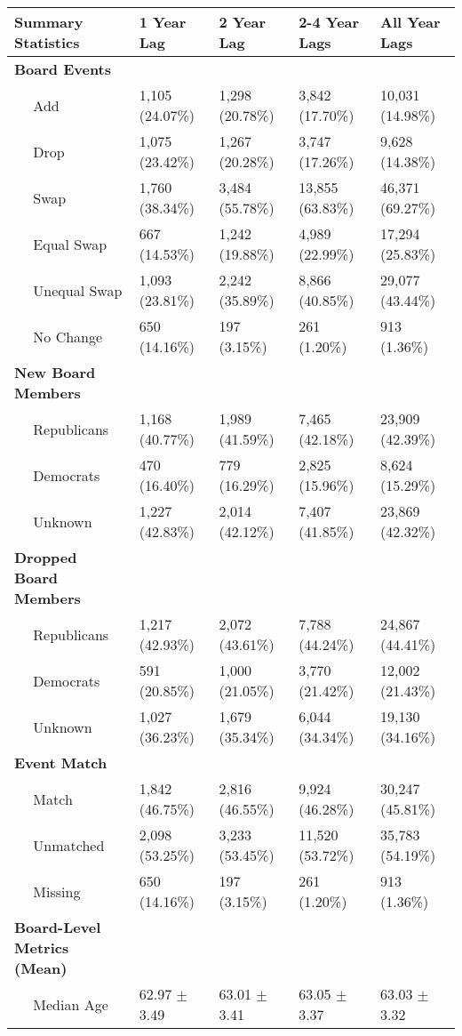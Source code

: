 
\begin{tabular}{lllll}
\toprule
Summary Statistics & 1 Year Lag & 2 Year Lag & 2-4 Year Lags & All Year Lags\\
\midrule
\bf{Board Events} & ~ & ~ & ~ & ~\\
~~ Add & 1,105 (24.07\%) & 1,298 (20.78\%) & 3,842 (17.70\%) & 10,031 (14.98\%)\\
~~ Drop & 1,075 (23.42\%) & 1,267 (20.28\%) & 3,747 (17.26\%) & 9,628 (14.38\%)\\
~~ Swap & 1,760 (38.34\%) & 3,484 (55.78\%) & 13,855 (63.83\%) & 46,371 (69.27\%)\\
~~ Equal Swap & 667 (14.53\%) & 1,242 (19.88\%) & 4,989 (22.99\%) & 17,294 (25.83\%)\\
\addlinespace
~~ Unequal Swap & 1,093 (23.81\%) & 2,242 (35.89\%) & 8,866 (40.85\%) & 29,077 (43.44\%)\\
~~ No Change & 650 (14.16\%) & 197 (3.15\%) & 261 (1.20\%) & 913 (1.36\%)\\
\bf{New Board Members} & ~ & ~ & ~ & ~\\
~~ Republicans & 1,168 (40.77\%) & 1,989 (41.59\%) & 7,465 (42.18\%) & 23,909 (42.39\%)\\
~~ Democrats & 470 (16.40\%) & 779 (16.29\%) & 2,825 (15.96\%) & 8,624 (15.29\%)\\
\addlinespace
~~ Unknown & 1,227 (42.83\%) & 2,014 (42.12\%) & 7,407 (41.85\%) & 23,869 (42.32\%)\\
\bf{Dropped Board Members} & ~ & ~ & ~ & ~\\
~~ Republicans & 1,217 (42.93\%) & 2,072 (43.61\%) & 7,788 (44.24\%) & 24,867 (44.41\%)\\
~~ Democrats & 591 (20.85\%) & 1,000 (21.05\%) & 3,770 (21.42\%) & 12,002 (21.43\%)\\
~~ Unknown & 1,027 (36.23\%) & 1,679 (35.34\%) & 6,044 (34.34\%) & 19,130 (34.16\%)\\
\addlinespace
\bf{Event Match} & ~ & ~ & ~ & ~\\
~~ Match & 1,842 (46.75\%) & 2,816 (46.55\%) & 9,924 (46.28\%) & 30,247 (45.81\%)\\
~~ Unmatched & 2,098 (53.25\%) & 3,233 (53.45\%) & 11,520 (53.72\%) & 35,783 (54.19\%)\\
~~ Missing & 650 (14.16\%) & 197 (3.15\%) & 261 (1.20\%) & 913 (1.36\%)\\
\bf{Board-Level Metrics (Mean)} & ~ & ~ & ~ & ~\\
\addlinespace
~~ Median Age & 62.97 $\pm$ 3.49 & 63.01 $\pm$ 3.41 & 63.05 $\pm$ 3.37 & 63.03 $\pm$ 3.32\\

\end{tabular}
